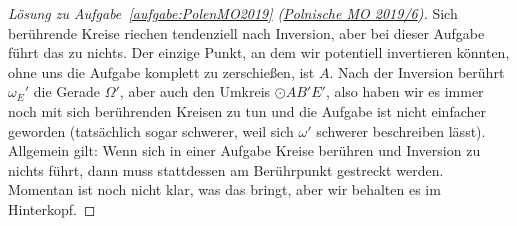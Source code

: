 \begin{proof}[Lösung zu Aufgabe~\ref{aufgabe:PolenMO2019} \textmd{(\href{https://artofproblemsolving.com/community/c904216_2019_polish_mo_finals}{Polnische MO 2019/6})}]
	Sich berührende Kreise riechen tendenziell nach Inversion, aber bei dieser Aufgabe führt das zu nichts. Der einzige Punkt, an dem wir potentiell invertieren könnten, ohne uns die Aufgabe komplett zu zerschießen, ist $A$. Nach der Inversion berührt $\omega_E'$ die Gerade $\Omega'$, aber auch den Umkreis $\odot AB'E'$, also haben wir es immer noch mit sich berührenden Kreisen zu tun und die Aufgabe ist nicht einfacher geworden (tatsächlich sogar schwerer, weil sich $\omega'$ schwerer beschreiben lässt). Allgemein gilt: Wenn sich in einer Aufgabe Kreise berühren und Inversion zu nichts führt, dann muss stattdessen am Berührpunkt gestreckt werden. Momentan ist noch nicht klar, was das bringt, aber wir behalten es im Hinterkopf.
	

\end{proof}
